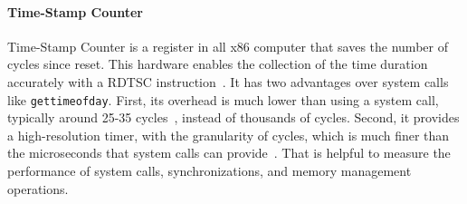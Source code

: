 \paragraph{Time-Stamp Counter} Time-Stamp Counter is a register in all x86 computer that saves the number of cycles since reset. This hardware enables the collection of the time duration accurately with a RDTSC instruction~\cite{coorporation1997using, weaver2013linux}. It has two advantages over system calls like \texttt{gettimeofday}. First, its overhead is much lower than using a system call, typically around 25-35 cycles~\cite{rdtscoverhead}, instead of thousands of cycles. Second, it provides a high-resolution timer, with the granularity of cycles, which is much finer than the microseconds that system calls can provide~\cite{pitfallsrdtsc}. That is helpful to measure the performance of system calls, synchronizations, and memory management operations. 





